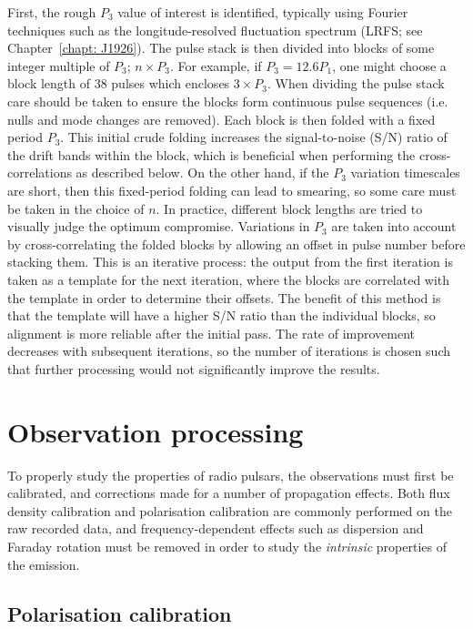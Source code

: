 First, the rough $P_3$ value of interest is identified, typically using Fourier techniques such as the longitude-resolved fluctuation spectrum (LRFS; see Chapter~\ref{chapt: J1926}). The pulse stack is then divided into blocks of some integer multiple of $P_3$; $n\times P_3$. For example, if $P_3 = 12.6 P_1$, one might choose a block length of 38 pulses which encloses $ 3\times P_3$. When dividing the pulse stack care should be taken to ensure the blocks form continuous pulse sequences (i.e. nulls and mode changes are removed). Each block is then folded with a fixed period $P_3$. This initial crude folding increases the signal-to-noise (S/N) ratio of the drift bands within the block, which is beneficial when performing the cross-correlations as described below. On the other hand, if the $P_3$ variation timescales are short, then this fixed-period folding can lead to smearing, so some care must be taken in the choice of $n$. In practice, different block lengths are tried to visually judge the optimum compromise. Variations in $P_3$ are taken into account by cross-correlating the folded blocks by allowing an offset in pulse number before stacking them. This is an iterative process: the output from the first iteration is taken as a template for the next iteration, where the blocks are correlated with the template in order to determine their offsets. The benefit of this method is that the template will have a higher S/N ratio than the individual blocks, so alignment is more reliable after the initial pass. The rate of improvement decreases with subsequent iterations, so the number of iterations is chosen such that further processing would not significantly improve the results.


\section{Observation processing}
\label{sec: intro - observation processing}

To properly study the properties of radio pulsars, the observations must first be calibrated, and corrections made for a number of propagation effects. Both flux density calibration and polarisation calibration are commonly performed on the raw recorded data, and frequency-dependent effects such as dispersion and Faraday rotation must be removed in order to study the \textit{intrinsic} properties of the emission.

\subsection{Polarisation calibration}
\label{sec: intro - observation processing - polarisation calibration}

